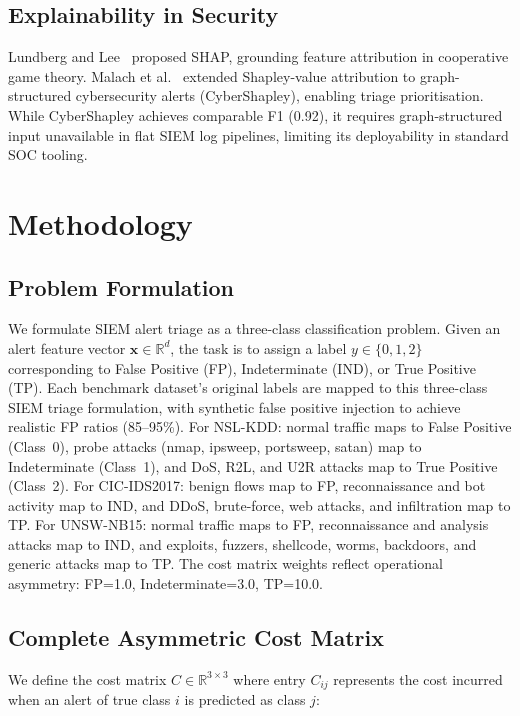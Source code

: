 \documentclass[conference]{IEEEtran}
\begin{document}
\subsection{Explainability in Security}
Lundberg and Lee~\cite{lundberg2017} proposed SHAP, grounding feature attribution in cooperative
game theory.
Malach et al.~\cite{malach2025} extended Shapley-value attribution to graph-structured
cybersecurity alerts (CyberShapley), enabling triage prioritisation.
While CyberShapley achieves comparable F1 (0.92), it requires graph-structured input
unavailable in flat SIEM log pipelines, limiting its deployability in standard SOC tooling.

\section{Methodology}
\label{sec:methodology}

\subsection{Problem Formulation}
We formulate SIEM alert triage as a three-class classification problem.
Given an alert feature vector $\mathbf{x} \in \mathbb{R}^{d}$, the task is to assign a
label $y \in \{0, 1, 2\}$ corresponding to False Positive (FP), Indeterminate (IND), or
True Positive (TP).
Each benchmark dataset's original labels are mapped to this three-class SIEM triage
formulation, with synthetic false positive injection to achieve realistic FP ratios
(85--95\%). For NSL-KDD: normal traffic maps to False Positive (Class~0),
probe attacks (nmap, ipsweep, portsweep, satan) map to Indeterminate (Class~1),
and DoS, R2L, and U2R attacks map to True Positive (Class~2).
For CIC-IDS2017: benign flows map to FP, reconnaissance and bot activity map to IND,
and DDoS, brute-force, web attacks, and infiltration map to TP.
For UNSW-NB15: normal traffic maps to FP, reconnaissance and analysis attacks map to IND,
and exploits, fuzzers, shellcode, worms, backdoors, and generic attacks map to TP.
The cost matrix weights reflect operational asymmetry: FP=1.0, Indeterminate=3.0, TP=10.0.

\subsection{Complete Asymmetric Cost Matrix}
\label{sec:cost_matrix}

We define the cost matrix $C \in \mathbb{R}^{3 \times 3}$ where entry $C_{ij}$ represents
the cost incurred when an alert of true class $i$ is predicted as class $j$:
\end{document}
